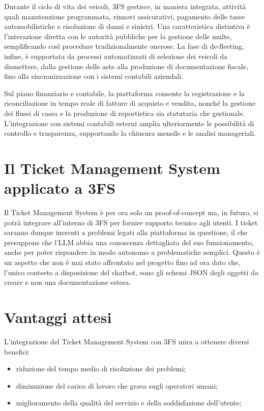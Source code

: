 Durante il ciclo di vita dei veicoli, 3FS{\textsuperscript{\tiny\textcopyright}} gestisce, in maniera integrata, attività quali manutenzione programmata, rinnovi assicurativi,
pagamento delle tasse automobilistiche e risoluzione di danni e sinistri. Una caratteristica distintiva è l'interazione diretta con le autorità
pubbliche per la gestione delle multe, semplificando così procedure tradizionalmente onerose. La fase di de-fleeting, infine, è supportata
da processi automatizzati di selezione dei veicoli da dismettere, dalla gestione delle aste alla produzione di documentazione fiscale, fino
alla sincronizzazione con i sistemi contabili aziendali.

Sul piano finanziario e contabile, la piattaforma consente la registrazione e la riconciliazione in tempo reale di fatture di acquisto e vendita,
nonché la gestione dei flussi di cassa e la produzione di reportistica sia statutaria che gestionale. L'integrazione con sistemi contabili esterni
amplia ulteriormente le possibilità di controllo e trasparenza, supportando la chiusura mensile e le analisi manageriali. \cite{progesoftware_3fs}

\newpage
\section{\texorpdfstring{Il Ticket Management System applicato a 3FS{\textsuperscript{\tiny\textcopyright}}}{Il Ticket Management System applicato a 3FS (c)}}
Il Ticket Management System è per ora solo un proof-of-concept ma, in futuro, si potrà integrare all'interno di 3FS{\textsuperscript{\tiny\textcopyright}} per fornire supporto tecnico agli utenti.
I ticket saranno dunque inerenti a problemi legati alla piattaforma in questione, il che presuppone che l'LLM abbia una conoscenza dettagliata del suo funzionamento,
anche per poter rispondere in modo autonomo a problematiche semplici. Questo è un aspetto che non è mai stato affrontato nel progetto fino ad ora
dato che, l'unico contesto a disposizione del chatbot, sono gli schemi JSON degli oggetti da creare e non una documentazione estesa.

\newpage
\section{Vantaggi attesi}
L'integrazione del Ticket Management System con 3FS{\textsuperscript{\tiny\textcopyright}} mira a ottenere diversi benefici:
\begin{itemize}
    \item riduzione del tempo medio di risoluzione dei problemi;
    \item diminuzione del carico di lavoro che grava sugli operatori umani;
    \item miglioramento della qualità del servizio e della soddisfazione dell'utente;
\end{itemize}

